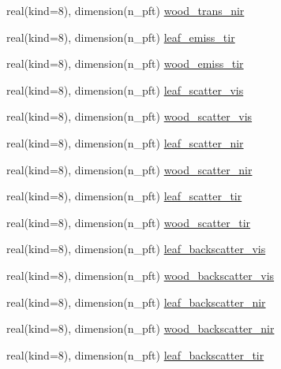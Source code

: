 \begin{DoxyCompactItemize}
\item 
real(kind=8), dimension(n\+\_\+pft) \hyperlink{namespacecanopy__radiation__coms_ac71bbd6b94c73251f3181441d9930d48}{wood\+\_\+trans\+\_\+nir}
\item 
real(kind=8), dimension(n\+\_\+pft) \hyperlink{namespacecanopy__radiation__coms_a248ba8c24adc6d99c25edf3176685c63}{leaf\+\_\+emiss\+\_\+tir}
\item 
real(kind=8), dimension(n\+\_\+pft) \hyperlink{namespacecanopy__radiation__coms_a0c1f3270236f47702572f6378dc5c27d}{wood\+\_\+emiss\+\_\+tir}
\item 
real(kind=8), dimension(n\+\_\+pft) \hyperlink{namespacecanopy__radiation__coms_abe59c68932814e1ebaf8c30137eec9bc}{leaf\+\_\+scatter\+\_\+vis}
\item 
real(kind=8), dimension(n\+\_\+pft) \hyperlink{namespacecanopy__radiation__coms_a9d7ea3e034dbcde978fae2353feae644}{wood\+\_\+scatter\+\_\+vis}
\item 
real(kind=8), dimension(n\+\_\+pft) \hyperlink{namespacecanopy__radiation__coms_a7f239d8adc86bab8014bb6f96dac2eb7}{leaf\+\_\+scatter\+\_\+nir}
\item 
real(kind=8), dimension(n\+\_\+pft) \hyperlink{namespacecanopy__radiation__coms_ab34f58c9789b2913a92e5c2d17b7fd6c}{wood\+\_\+scatter\+\_\+nir}
\item 
real(kind=8), dimension(n\+\_\+pft) \hyperlink{namespacecanopy__radiation__coms_a7574590f5e0778766955f748399b442b}{leaf\+\_\+scatter\+\_\+tir}
\item 
real(kind=8), dimension(n\+\_\+pft) \hyperlink{namespacecanopy__radiation__coms_a12d5a36e73bfb817a8e507e98b6e91ee}{wood\+\_\+scatter\+\_\+tir}
\item 
real(kind=8), dimension(n\+\_\+pft) \hyperlink{namespacecanopy__radiation__coms_a8cd51ee75d68dd0a955f06421a558c5d}{leaf\+\_\+backscatter\+\_\+vis}
\item 
real(kind=8), dimension(n\+\_\+pft) \hyperlink{namespacecanopy__radiation__coms_a8fa916f5cdac8472a33b13b73dfc2745}{wood\+\_\+backscatter\+\_\+vis}
\item 
real(kind=8), dimension(n\+\_\+pft) \hyperlink{namespacecanopy__radiation__coms_a75268e30022c7434bebd2e83c785e0ee}{leaf\+\_\+backscatter\+\_\+nir}
\item 
real(kind=8), dimension(n\+\_\+pft) \hyperlink{namespacecanopy__radiation__coms_af78ebf7d715955c43ea9bdf6dd48dd1d}{wood\+\_\+backscatter\+\_\+nir}
\item 
real(kind=8), dimension(n\+\_\+pft) \hyperlink{namespacecanopy__radiation__coms_a04c8cd0c8fb5db0488f313482b6f532d}{leaf\+\_\+backscatter\+\_\+tir}

\end{DoxyCompactItemize}
